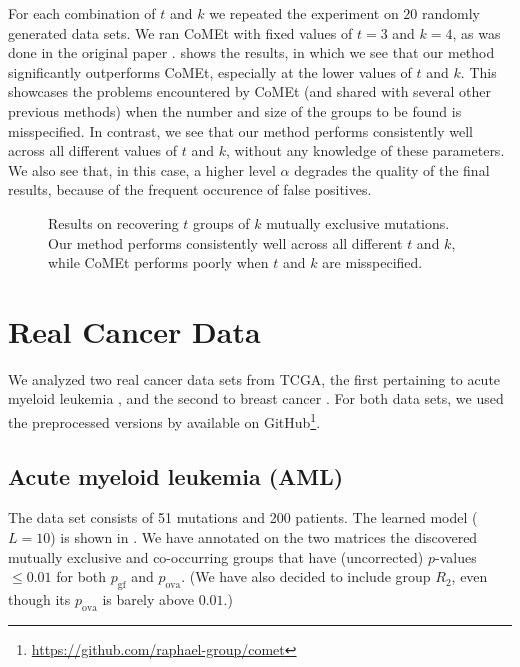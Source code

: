 For each combination of $t$ and $k$ we repeated the experiment on $20$ randomly generated data sets.
We ran CoMEt with fixed values of $t = 3$ and $k = 4$, as was done in the original paper \citep{comet}.
 shows the results, in which we see that our method significantly outperforms CoMEt, especially at the lower values of $t$ and $k$.
This showcases the problems encountered by CoMEt (and shared with several other previous methods) when the number and size of the groups to be found is misspecified.
In contrast, we see that our method performs consistently well across all different values of $t$ and $k$, without any knowledge of these parameters.
We also see that, in this case, a higher level $\alpha$ degrades the quality of the final results, because of the frequent occurence of false positives.


\setlength{}
\setlength{}
\begin{figure}[htb]
  \hspace{-0.9cm}
  \caption{Results on recovering $t$ groups of $k$ mutually exclusive mutations.
Our method performs consistently well across all different $t$ and $k$, while CoMEt performs poorly when $t$ and $k$ are misspecified.
  }
  \label{fig:syn_multi}
\end{figure}

\section{Real Cancer Data} \label{sect:realcancer}
We analyzed two real cancer data sets from TCGA, the first pertaining to acute myeloid leukemia \citep{tcga_aml}, and the second to breast cancer \citep{tcga_brca}.
For both data sets, we used the preprocessed versions by \cite{comet} available on GitHub\footnote{\url{https://github.com/raphael-group/comet}}.

\subsection{Acute myeloid leukemia (AML)}
The data set consists of 51 mutations and 200 patients.
The learned \fldc{} model ($L = 10$) is shown in .
We have annotated on the two matrices the discovered mutually exclusive and co-occurring groups that have (uncorrected) $p$-values $\leq 0.01$ for both $p_{\mathrm{gf}}$ and $p_{\mathrm{ova}}$.
(We have also decided to include group $R_2$, even though its $p_{\mathrm{ova}}$ is barely above $0.01$.)

